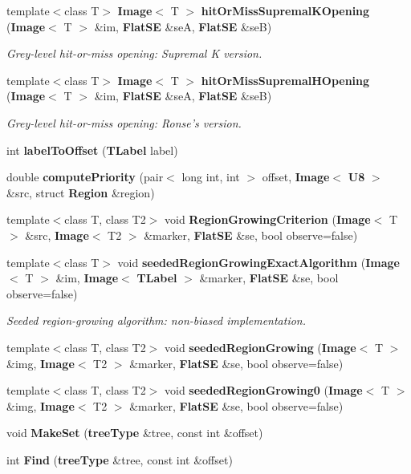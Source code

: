 \begin{CompactItemize}
template$<$class T$>$ {\bf Image}$<$ T $>$ {\bf hit\-Or\-Miss\-Supremal\-KOpening} ({\bf Image}$<$ T $>$ \&im, {\bf Flat\-SE} \&se\-A, {\bf Flat\-SE} \&se\-B)
\begin{CompactList}\small\item\em Grey-level hit-or-miss opening: Supremal K version. \item\end{CompactList}\item 
template$<$class T$>$ {\bf Image}$<$ T $>$ {\bf hit\-Or\-Miss\-Supremal\-HOpening} ({\bf Image}$<$ T $>$ \&im, {\bf Flat\-SE} \&se\-A, {\bf Flat\-SE} \&se\-B)
\begin{CompactList}\small\item\em Grey-level hit-or-miss opening: Ronse's version. \item\end{CompactList}\item 
int {\bf label\-To\-Offset} ({\bf TLabel} label)
\item 
double {\bf compute\-Priority} (pair$<$ long int, int $>$ offset, {\bf Image}$<$ {\bf U8} $>$ \&src, struct {\bf Region} \&region)
\item 
template$<$class T, class T2$>$ void {\bf Region\-Growing\-Criterion} ({\bf Image}$<$ T $>$ \&src, {\bf Image}$<$ T2 $>$ \&marker, {\bf Flat\-SE} \&se, bool observe=false)
\item 
template$<$class T$>$ void {\bf seeded\-Region\-Growing\-Exact\-Algorithm} ({\bf Image}$<$ T $>$ \&im, {\bf Image}$<$ {\bf TLabel} $>$ \&marker, {\bf Flat\-SE} \&se, bool observe=false)
\begin{CompactList}\small\item\em Seeded region-growing algorithm: non-biased implementation. \item\end{CompactList}\item 
template$<$class T, class T2$>$ void {\bf seeded\-Region\-Growing} ({\bf Image}$<$ T $>$ \&img, {\bf Image}$<$ T2 $>$ \&marker, {\bf Flat\-SE} \&se, bool observe=false)
\item 
template$<$class T, class T2$>$ void {\bf seeded\-Region\-Growing0} ({\bf Image}$<$ T $>$ \&img, {\bf Image}$<$ T2 $>$ \&marker, {\bf Flat\-SE} \&se, bool observe=false)
\item 
void {\bf Make\-Set} ({\bf tree\-Type} \&tree, const int \&offset)
\item 
int {\bf Find} ({\bf tree\-Type} \&tree, const int \&offset)
\item 

\end{CompactItemize}
